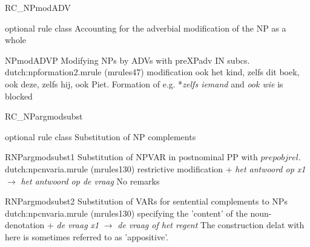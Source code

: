 \begin{mruleclass}{RC\_NPmodADV}
\begin{classdescr}
\kind optional rule class
\classtask Accounting for the adverbial modification of the NP as a whole
\classremarks
\nofilters
\nospeedrules
\noplannedrules
\norulesnotince
\begin{comments}
\end{comments}
\end{classdescr}

\begin{members}
\begin{member}
 NPmodADVP
 Modifying NPs by ADVs with preXPadv IN subcs.
\file dutch:npformation2.mrule (mrules47)
\semantics modification
\example ook het kind, zelfs dit boek, ook deze, zelfs hij,
ook Piet. 
\remarks Formation of e.g. *{\em zelfs iemand} and  {\em *ook wie} is blocked
\end{member}
\end{members}
\end{mruleclass}

\begin{mruleclass}{RC\_NPargmodsubst}
\begin{classdescr}
\kind optional rule class
\classtask Substitution of NP complements
\classremarks
\nofilters
\nospeedrules
\noplannedrules
\norulesnotince
\begin{comments}
\end{comments}
\end{classdescr}

\begin{members}

\begin{member}
 RNPargmodsubst1
 Substitution of NPVAR in postnominal PP with $prepobjrel$.
\file dutch:npcnvaria.mrule (mrules130)
\semantics restrictive modification
 + {\em het antwoord op x1} $\rightarrow$ {\em 
het antwoord op de vraag}
\remarks No remarks
\end{member}
\begin{member}
 RNPargmodsubst2
 Substitution of VARs for sentential complements to NPs
\file dutch:npcnvaria.mrule (mrules130)
\semantics specifying the 'content' of the noun-denotation
 + 
{\em de vraag x1} $\rightarrow$ {\em de vraag of het regent}
\remarks The construction delat with here is sometimes referred to 
as 'appositive'.
\end{member}
\end{members}
\end{mruleclass}


